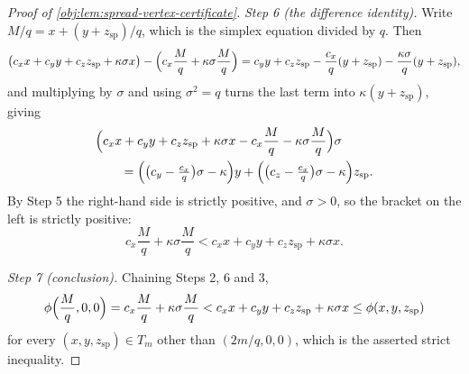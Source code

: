 \begin{proof}[Proof of \cref{obj:lem:spread-vertex-certificate}]
\emph{Step 6 (the difference identity).}  Write \(M/q=x+(y+z_{\mathrm{sp}})/q\), which is the simplex equation divided by \(q\).  Then
\[
\bigl(c_xx+c_yy+c_zz_{\mathrm{sp}}+\kappa\sigma x\bigr)
-\Bigl(c_x\frac Mq+\kappa\sigma\frac Mq\Bigr)
=c_yy+c_zz_{\mathrm{sp}}-\frac{c_x}{q}(y+z_{\mathrm{sp}})-\frac{\kappa\sigma}{q}(y+z_{\mathrm{sp}}),
\]
and multiplying by \(\sigma\) and using \(\sigma^2=q\) turns the last term into \(\kappa(y+z_{\mathrm{sp}})\), giving
\[
\begin{aligned}
&\Bigl(c_xx+c_yy+c_zz_{\mathrm{sp}}+\kappa\sigma x
-c_x\frac Mq-\kappa\sigma\frac Mq\Bigr)\sigma\\
&\qquad=\Bigl(\bigl(c_y-\tfrac{c_x}{q}\bigr)\sigma-\kappa\Bigr)y
+\Bigl(\bigl(c_z-\tfrac{c_x}{q}\bigr)\sigma-\kappa\Bigr)z_{\mathrm{sp}} .
\end{aligned}
\]
By Step 5 the right-hand side is strictly positive, and \(\sigma>0\), so the bracket on the left is strictly positive:
\[
c_x\frac Mq+\kappa\sigma\frac Mq<c_xx+c_yy+c_zz_{\mathrm{sp}}+\kappa\sigma x .
\]

\emph{Step 7 (conclusion).}  Chaining Steps 2, 6 and 3,
\[
\phi\Bigl(\frac Mq,0,0\Bigr)
=c_x\frac Mq+\kappa\sigma\frac Mq
<c_xx+c_yy+c_zz_{\mathrm{sp}}+\kappa\sigma x
\le\phi(x,y,z_{\mathrm{sp}})
\]
for every \((x,y,z_{\mathrm{sp}})\in T_m\) other than \((2m/q,0,0)\), which is the asserted strict inequality. %
\end{proof}
